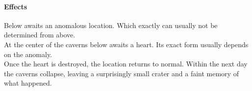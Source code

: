 \paragraph{Effects}
Below awaits an anomalous location.
Which exactly can usually not be determined from above.
\\%
At the center of the caverns below awaits a heart.
Its exact form usually depends on the anomaly.
\\%
Once the heart is destroyed,
	the location returns to normal.
Within the next day the caverns collapse,
	leaving a surprisingly small crater
	and a faint memory of what happened.
